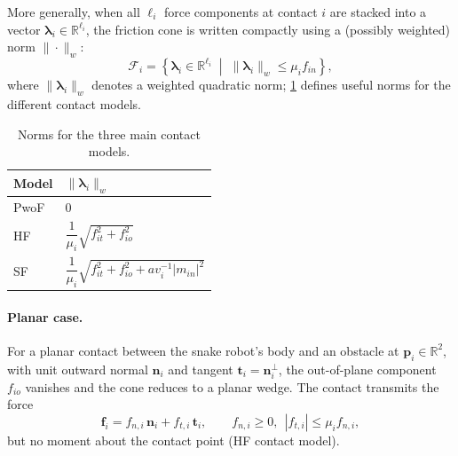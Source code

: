 More generally, when all $\ell_i$ force components at contact $i$ are stacked
into a vector $\boldsymbol{\lambda}_i \in \mathbb{R}^{\ell_i}$, the friction
cone is written compactly using a (possibly weighted) norm $\|\cdot\|_w$:
\begin{equation}
    \mathcal{F}_i = \left\{ \boldsymbol{\lambda}_i \in \mathbb{R}^{\ell_i} \;\middle|\; \|\boldsymbol{\lambda}_i\|_w \le \mu_i f_{in} \right\},
    \label{eq:friction-cone-general}
\end{equation}
where $\|\boldsymbol{\lambda}_i\|_w$ denotes a weighted quadratic norm;
\cref{tab:norms-contact-models} defines useful norms for the different
contact models.
\begin{table}[htbp]
    \centering
    \caption{Norms for the three main contact models.}
    \label{tab:norms-contact-models}
    \begin{tabular}{ll}
        \toprule
        Model & $\|\boldsymbol{\lambda}_i\|_w$ \\
        \midrule
        PwoF & $0$ \\[4pt]
        HF   & $\dfrac{1}{\mu_i}\sqrt{f_{it}^2 + f_{io}^2}$ \\[10pt]
        SF   & $\dfrac{1}{\mu_i}\sqrt{f_{it}^2 + f_{io}^2 + a v_i^{-1} \lvert m_{in} \rvert^2}$ \\
        \bottomrule
    \end{tabular}
\end{table}

\paragraph{Planar case.}
For a planar contact between the snake robot's body and an obstacle at
$\boldsymbol{p}_i \in \mathbb{R}^2$, with unit outward normal
$\boldsymbol{n}_i$ and tangent $\boldsymbol{t}_i = \boldsymbol{n}_i^{\perp}$,
the out-of-plane component $f_{io}$ vanishes and the cone reduces to a planar
wedge. The contact transmits the force
\begin{equation}
    \boldsymbol{f}_i = f_{n,i}\,\boldsymbol{n}_i + f_{t,i}\,\boldsymbol{t}_i,
    \qquad f_{n,i} \ge 0,\ \ |f_{t,i}| \le \mu_i f_{n,i},
    \label{eq:friction-cone}
\end{equation}
but no moment about the contact point (HF contact model).

